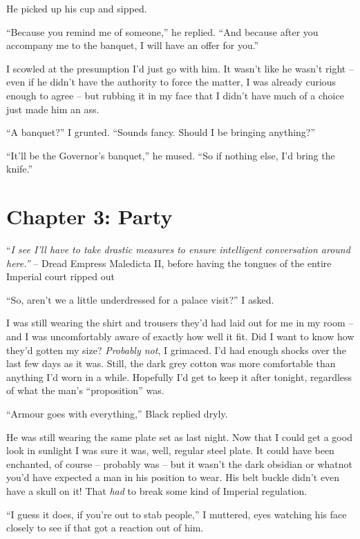 \documentclass[12pt, openany]{book}
\begin{document}
He picked up his cup and sipped.

“Because you remind me of someone,” he replied. “And because after you accompany me to the banquet, I will have an offer for you.”

I scowled at the presumption I’d just go with him. It wasn’t like he wasn’t right – even if he didn’t have the authority to force the matter, I was already curious enough to agree – but rubbing it in my face that I didn’t have much of a choice just made him an ass.

“A banquet?” I grunted. “Sounds fancy. Should I be bringing anything?”

“It’ll be the Governor’s banquet,” he mused. “So if nothing else, I’d bring the knife.”
\clearpage
\chapter{Chapter 3: Party}

“\textit{I see I’ll have to take drastic measures to ensure intelligent conversation around here.”}
– Dread Empress Maledicta II, before having the tongues of the entire Imperial court ripped out

“So, aren’t we a little underdressed for a palace visit?” I asked.

I was still wearing the shirt and trousers they’d had laid out for me in my room – and I was uncomfortably aware of exactly how well it fit. Did I want to know how they’d gotten my size? \textit{Probably not}, I grimaced. I’d had enough shocks over the last few days as it was. Still, the dark grey cotton was more comfortable than anything I’d worn in a while. Hopefully I’d get to keep it after tonight, regardless of what the man’s “proposition” was.

“Armour goes with everything,” Black replied dryly.

He was still wearing the same plate set as last night. Now that I could get a good look in sunlight I was sure it was, well, regular steel plate. It could have been enchanted, of course – probably was – but it wasn’t the dark obsidian or whatnot you’d have expected a man in his position to wear. His belt buckle didn’t even have a skull on it! That \textit{had} to break some kind of Imperial regulation.

“I guess it does, if you’re out to stab people,” I muttered, eyes watching his face closely to see if that got a reaction out of him.
\end{document}
